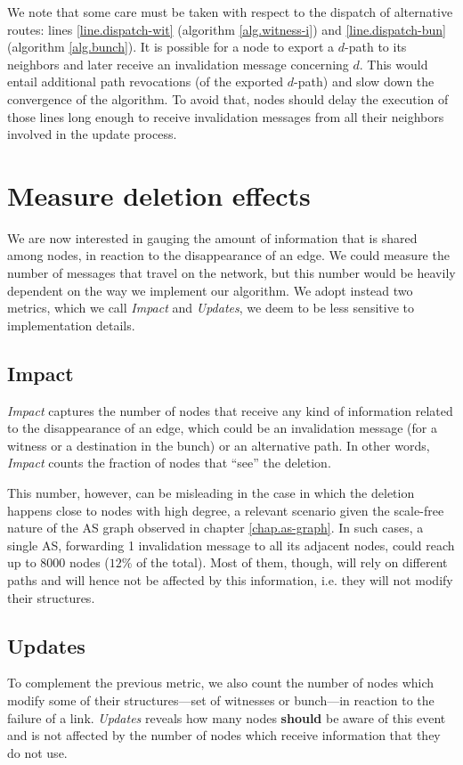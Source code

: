 \documentclass[a4paper,11pt,oneside]{report}
\begin{document}
\bigskip
We note that some care must be taken with respect to the dispatch of alternative routes: lines \ref{line.dispatch-wit} (algorithm \ref{alg.witness-i}) and \ref{line.dispatch-bun} (algorithm \ref{alg.bunch}). It is possible for a node to export a $d$-path to its neighbors and later receive an invalidation message concerning $d$. This would entail additional path revocations (of the exported $d$-path) and slow down the convergence of the algorithm. To avoid that, nodes should delay the execution of those lines long enough to receive invalidation messages from all their neighbors involved in the update process.

\section{Measure deletion effects}
We are now interested in gauging the amount of information that is shared among nodes, in reaction to the disappearance of an edge. We could measure the number of messages that travel on the network, but this number would be heavily dependent on the way we implement our algorithm. We adopt instead two metrics, which we call \emph{Impact} and \emph{Updates}, we deem to be less sensitive to implementation details.

\subsection{Impact}
\textit{Impact} captures the number of nodes that receive any kind of information related to the disappearance of an edge, which could be an invalidation message (for a witness or a destination in the bunch) or an alternative path.
In other words, \textit{Impact} counts the fraction of nodes that ``see'' the deletion.

This number, however, can be misleading in the case in which the deletion happens close to nodes with high degree, a relevant scenario given the scale-free nature of the AS graph observed in chapter \ref{chap.as-graph}. In such cases, a single AS, forwarding 1 invalidation message to all its adjacent nodes, could reach up to 8000 nodes ($12\%$ of the total). Most of them, though, will rely on different paths and will hence not be affected by this information, i.e. they will not modify their structures.

\subsection{Updates}
To complement the previous metric, we also count the number of nodes which modify some of their structures---set of witnesses or bunch---in reaction to the failure of a link. \textit{Updates} reveals how many nodes \textbf{should} be aware of this event and is not affected by the number of nodes which receive information that they do not use.
\end{document}
